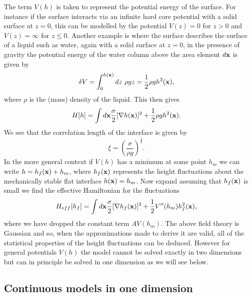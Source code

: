 The term $V(h)$ is taken to represent the potential energy of the surface. For instance if the surface interacts via an infinite hard core potential with a solid surface at $z=0$, this can be modelled by the potential $V(z) =0$ for $z>0$ and $V(z)=\infty$ for $z\leq 0$. Another example is where the surface describes the surface of a liquid such as water, again with a solid surface at $z=0$, in the presence of gravity the potential energy of the water column above the area 
element $d{\bf x}$ is given by
\begin{equation}
\delta V = \int_0^{h({\bf x})} dz\ \rho g z = \frac{1}{2}\rho g h^2({\bf x}),
\end{equation}
where $\rho$ is the (mass) density of the liquid. This then gives
\begin{equation}
H[h] = \int d{\bf x} \frac{\sigma}{2}[\nabla h({\bf x})]^2 + \frac{1}{2}\rho g h^2({\bf x}).
\end{equation}
We see that the correlation length of the interface is given by
\begin{equation}
\xi = \left(\frac{\sigma}{\rho g}\right)^{\frac{1}{2}}.
\end{equation}
In the more general context if $V(h)$ has a minimum at some point $h_m$ we can write $h= h_f({\bf x})+ h_m$, where  $h_f({\bf x})$ represents the height fluctuations about the mechanically stable flat interface $h({\bf x})=h_m$. Now expand assuming that $h_f({\bf x})$ is
small we find the effective Hamiltonian for the fluctuations
\begin{equation}
H_{eff}[h_f] = \int d{\bf x} \frac{\sigma}{2}[\nabla h_f({\bf x})]^2 + \frac{1}{2}V''(h_m) h_f^2({\bf x}),
\end{equation}
where we have dropped the constant term $AV(h_m)$. The above field theory is Gaussian and 
so, when the approximations made to derive it are valid, all of the statistical properties of the height fluctuations can be deduced. However for general potentials $V(h)$ the model cannot be solved exactly in two dimensions but can in principle be solved in one dimension as we will see below.
\subsection{Continuous models in one dimension}

